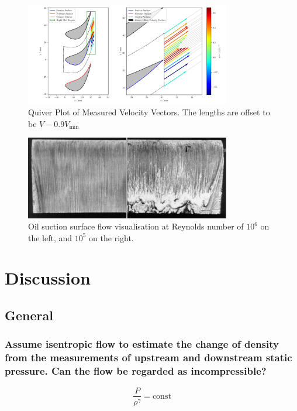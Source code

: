 \documentclass{article}
\begin{document}
\begin{figure}[H]
    \centering
    \includegraphics[width=0.8\textwidth]{figures/quiver_plot.png}
    \caption{Quiver Plot of Measured Velocity Vectors. The lengths are offset to be $V-0.9V_\text{min}$}
    \label{fig:quiver_plot}
\end{figure}

\begin{figure}[H]
    \centering
    \includegraphics[width=0.8\textwidth]{figures/surface_vis.png}
    \caption{Oil suction surface flow visualisation at Reynolds number of $10^6$ on the left, and $10^5$ on the right.}
    \label{fig:surface_vis}
\end{figure}

\section{Discussion}

\subsection{General}

\subsubsection{ Assume isentropic flow to estimate the change of density from the measurements of
upstream and downstream static pressure. Can the flow be regarded as incompressible?}

\begin{equation}
    \frac{P}{\rho^\gamma} = \text{const}
\end{equation}
\end{document}
